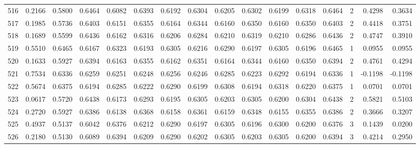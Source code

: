 \begin{tabular}{lrrrrrrrrrrrrrrr}
516 &      0.2166 &  0.5800 &  0.6464 &  0.6082 &  0.6393 &  0.6192 &  0.6304 &  0.6205 &  0.6302 &  0.6199 &   0.6318 &     0.6464 &      2 &                    0.4298 &                     0.3634 \\
517 &      0.1985 &  0.5736 &  0.6403 &  0.6151 &  0.6355 &  0.6164 &  0.6344 &  0.6160 &  0.6350 &  0.6160 &   0.6350 &     0.6403 &      2 &                    0.4418 &                     0.3751 \\
518 &      0.1689 &  0.5599 &  0.6436 &  0.6162 &  0.6316 &  0.6206 &  0.6284 &  0.6210 &  0.6319 &  0.6210 &   0.6286 &     0.6436 &      2 &                    0.4747 &                     0.3910 \\
519 &      0.5510 &  0.6465 &  0.6167 &  0.6323 &  0.6193 &  0.6305 &  0.6216 &  0.6290 &  0.6197 &  0.6305 &   0.6196 &     0.6465 &      1 &                    0.0955 &                     0.0955 \\
520 &      0.1633 &  0.5927 &  0.6394 &  0.6163 &  0.6355 &  0.6162 &  0.6351 &  0.6164 &  0.6344 &  0.6160 &   0.6350 &     0.6394 &      2 &                    0.4761 &                     0.4294 \\
521 &      0.7534 &  0.6336 &  0.6259 &  0.6251 &  0.6248 &  0.6256 &  0.6246 &  0.6285 &  0.6223 &  0.6292 &   0.6194 &     0.6336 &      1 &                   -0.1198 &                    -0.1198 \\
522 &      0.5674 &  0.6375 &  0.6194 &  0.6285 &  0.6222 &  0.6290 &  0.6199 &  0.6308 &  0.6194 &  0.6318 &   0.6220 &     0.6375 &      1 &                    0.0701 &                     0.0701 \\
523 &      0.0617 &  0.5720 &  0.6438 &  0.6173 &  0.6293 &  0.6195 &  0.6305 &  0.6203 &  0.6305 &  0.6200 &   0.6304 &     0.6438 &      2 &                    0.5821 &                     0.5103 \\
524 &      0.2720 &  0.5927 &  0.6386 &  0.6138 &  0.6368 &  0.6158 &  0.6361 &  0.6159 &  0.6348 &  0.6155 &   0.6355 &     0.6386 &      2 &                    0.3666 &                     0.3207 \\
525 &      0.4937 &  0.5137 &  0.6042 &  0.6376 &  0.6212 &  0.6290 &  0.6197 &  0.6305 &  0.6196 &  0.6300 &   0.6200 &     0.6376 &      3 &                    0.1439 &                     0.0200 \\
526 &      0.2180 &  0.5130 &  0.6089 &  0.6394 &  0.6209 &  0.6290 &  0.6202 &  0.6305 &  0.6203 &  0.6305 &   0.6200 &     0.6394 &      3 &                    0.4214 &                     0.2950 \\

\end{tabular}
